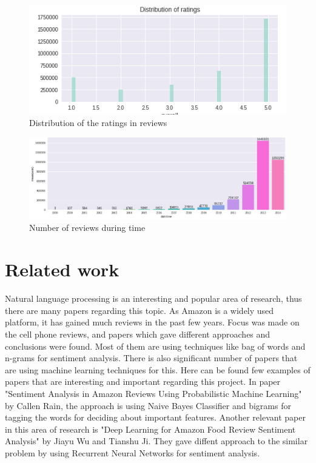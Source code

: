 \documentclass[11pt]{article}
\begin{document}
\begin{figure}[h!]
  \centering
    \includegraphics[width=\linewidth]{ratingDistribution.png}
  \caption{Distribution of the ratings in reviews}
  \label{fig:ratingDistribution}
\end{figure}


\begin{figure}[h!]
  \centering
    \includegraphics[width=\linewidth]{reviewsByTime.png}
  \caption{Number of reviews during time}
  \label{fig:reviewsByTime}
\end{figure}


\section{Related work}
Natural language processing is an interesting and popular area of research, thus there are many papers regarding this topic. As Amazon is a widely used platform, it has gained much reviews in the past few years. Focus was made on the cell phone reviews, and papers which gave different approaches and conclusions were found. Most of them are using techniques like bag of words and n-grams for sentiment analysis. There is also significant number of papers that are using machine learning techniques for this. Here can be found few examples of papers that are interesting and important regarding this project. In paper "Sentiment Analysis in Amazon Reviews Using Probabilistic Machine Learning" by Callen Rain, the approach is using Naive Bayes Classifier and bigrams for tagging the words for deciding about important features. Another relevant paper in this area of research is "Deep Learning for Amazon Food Review Sentiment Analysis" by Jiayu Wu and Tianshu Ji. They gave diffent approach to the similar problem by using Recurrent Neural Networks for sentiment analysis. 
\end{document}
